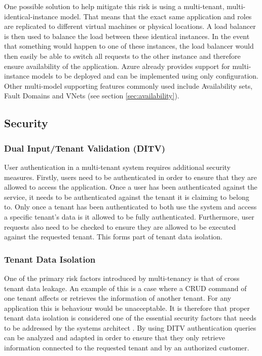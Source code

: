 One possible solution to help mitigate this risk is using a multi-tenant, multi-identical-instance model. That means that the exact same application and roles are replicated to different virtual machines or physical locations. A load balancer is then used to balance the load between these identical instances. In the event that something would happen to one of these instances, the load balancer would then easily be able to switch all requests to the other instance and therefore ensure availability of the application. Azure already provides support for multi-instance models to be deployed and can be implemented using only configuration. Other multi-model supporting features commonly used include Availability sets, Fault Domains and VNets (see section \ref{sec:availability}).


\subsection{Security}
\label{sec:security} 

\subsubsection{Dual Input/Tenant Validation (DITV)}
\label{sec:ditv}
User authentication in a multi-tenant system requires additional security measures. Firstly, users need to be authenticated in order to ensure that they are allowed to access the application. Once a user has been authenticated against the service, it needs to be authenticated against the tenant it is claiming to belong to. Only once a tenant has been authenticated to both use the system and access a specific tenant's data is it allowed to be fully authenticated. Furthermore, user requests also need to be checked to ensure they are allowed to be executed against the requested tenant. This forms part of tenant data isolation.


\subsubsection{Tenant Data Isolation}
One of the primary risk factors introduced by multi-tenancy is that of cross tenant data leakage. An example of this is a case where a CRUD command of one tenant affects or retrieves the information of another tenant. For any application this is behaviour would be unacceptable. It is therefore that proper tenant data isolation is considered one of the essential security factors that needs to be addressed by the systems architect \cite{Wilder2012-so}. By using DITV authentication queries can be analyzed and adapted in order to ensure that they only retrieve information connected to the requested tenant and by an authorized customer.


